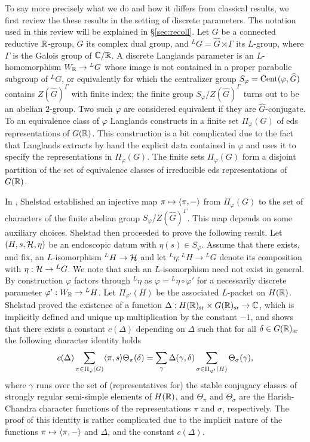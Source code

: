 \documentclass{article}
\theoremstyle{definition}
\numberwithin{equation}{section}
\renewcommand{\-}{\hyp{}}
\begin{document}
To say more precisely what we do and how it differs from classical results, we first review the these results in the setting of discrete parameters. The notation used in this review will be explained in \S\ref{sec:recoll}. Let $G$ be a connected reductive $\mathbb{R}$-group, $\hat G$ its complex dual group, and $^LG=\hat G \rtimes \Gamma$ its $L$\-group, where $\Gamma$ is the Galois group of $\mathbb{C}/\mathbb{R}$. A discrete Langlands parameter is an $L$\-homomorphism $W_{\mathbb{R}} \to {^LG}$ whose image is not contained in a proper parabolic subgroup of $^LG$, or equivalently for which the centralizer group $S_\varphi=\textrm{Cent}(\varphi,\widehat G)$ contains $Z(\hat G)^\Gamma$ with finite index; the finite group $S_\varphi/Z(\hat G)^\Gamma$ turns out to be an abelian $2$-group. Two such $\varphi$ are considered equivalent if they are $\hat G$-conjugate. To an equivalence class of $\varphi$ Langlands constructs in \cite[\S3]{Lan89} a finite set $\Pi_\varphi(G)$ of eds representations of $G(\mathbb{R})$. This construction is a bit complicated due to the fact that Langlands extracts by hand the explicit data contained in $\varphi$ and uses it to specify the representations in $\Pi_\varphi(G)$. The finite sets $\Pi_\varphi(G)$ form a disjoint partition of the set of equivalence classes of irreducible eds representations of $G(\mathbb{R})$.

In \cite{She82}, Shelstad established an injective map $\pi \mapsto \langle\pi,-\rangle$ from $\Pi_\varphi(G)$ to the set of characters of the finite abelian group $S_\varphi/Z(\hat G)^\Gamma$. This map depends on some auxiliary choices. Shelstad then proceeded to prove the following result. Let $(H,s,\mathcal{H},\eta)$ be an endoscopic datum with $\eta(s) \in S_\varphi$. Assume that there exists, and fix, an $L$\-isomorphism $^LH \to \mathcal{H}$ and let $^L\eta : {^LH} \to {^LG}$ denote its composition with $\eta : \mathcal{H} \to {^LG}$. We note that such an $L$\-isomorphism need not exist in general. By construction $\varphi$ factors through $^L\eta$ as $\varphi = {^L\eta}\circ\varphi'$ for a necessarily discrete parameter $\varphi' : W_{\mathbb{R}} \to {^LH}$. Let $\Pi_{\varphi'}(H)$ be the associated $L$\-packet on $H(\mathbb{R})$. Shelstad proved the existence of a function $\Delta : H(\mathbb{R})_{\textrm{sr}} \times G(\mathbb{R})_{\textrm{sr}} \to \mathbb{C}$, which is implicitly defined and unique up multiplication by the constant $-1$, and shows that there exists a constant $c(\Delta)$ depending on $\Delta$ such that for all $\delta \in G(\mathbb{R})_{\textrm{sr}}$ the following character identity holds
\begin{equation} \label{eq:s1}
c(\Delta)\sum_{\pi \in \Pi_\varphi(G)}\langle\pi,s\rangle\Theta_\pi(\delta) = \sum_\gamma \Delta(\gamma,\delta)\sum_{\sigma \in \Pi_{\varphi'}(H)} \Theta_{\sigma}(\gamma),
\end{equation}
where $\gamma$ runs over the set of (representatives for) the stable conjugacy classes of strongly regular semi-simple elements of $H(\mathbb{R})$, and $\Theta_\pi$ and $\Theta_\sigma$ are the Harish-Chandra character functions of the representations $\pi$ and $\sigma$, respectively. The proof of this identity is rather complicated due to the implicit nature of the functions $\pi \mapsto \langle\pi,-\rangle$ and $\Delta$, and the constant $c(\Delta)$.
\end{document}
